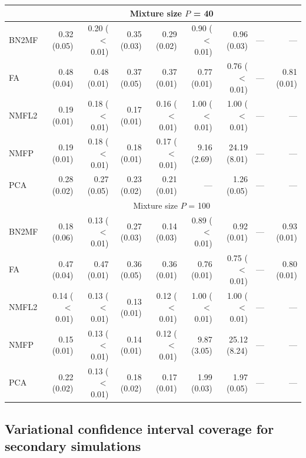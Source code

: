 {\begin{landscape}
\begin{table}[!htbp]
\begin{tabular}{lrr|rr|rr|rr}
\hline 
& \multicolumn{8}{c}{Mixture size $P$ = 40} \\
\hline 
BN2MF & 0.32 (0.05) & 0.20 ($<$0.01) & 0.35 (0.03) & 0.29 (0.02) & 0.90 ($<$0.01) & 0.96 (0.03) & --- & --- \\ 
FA & 0.48 (0.04) & 0.48 (0.01) & 0.37 (0.05) & 0.37 (0.01) & 0.77 (0.01) & 0.76 ($<$0.01) & --- & 0.81 (0.01) \\ 
NMFL2 & 0.19 (0.01) & 0.18 ($<$0.01) & 0.17 (0.01) & 0.16 ($<$0.01) & 1.00 ($<$0.01) & 1.00 ($<$0.01) & --- & --- \\ 
NMFP & 0.19 (0.01) & 0.18 ($<$0.01) & 0.18 (0.01) & 0.17 ($<$0.01) & 9.16 (2.69) & 24.19 (8.01) & --- & --- \\ 
PCA & 0.28 (0.02) & 0.27 (0.05) & 0.23 (0.02) & 0.21 (0.01) & --- & 1.26 (0.05) & --- & --- \\ 
\hline 
& \multicolumn{8}{c}{Mixture size $P$ = 100} \\
\hline 
BN2MF & 0.18 (0.06) & 0.13 ($<$0.01) & 0.27 (0.03) & 0.14 (0.03) & 0.89 ($<$0.01) & 0.92 (0.01) & --- & 0.93 (0.01) \\ 
FA & 0.47 (0.04) & 0.47 (0.01) & 0.36 (0.05) & 0.36 (0.01) & 0.76 (0.01) & 0.75 ($<$0.01) & --- & 0.80 (0.01) \\ 
NMFL2 & 0.14 ($<$0.01) & 0.13 ($<$0.01) & 0.13 (0.01) & 0.12 ($<$0.01) & 1.00 ($<$0.01) & 1.00 ($<$0.01) & --- & --- \\ 
NMFP & 0.15 (0.01) & 0.13 ($<$0.01) & 0.14 (0.01) & 0.12 ($<$0.01) & 9.87 (3.05) & 25.12 (8.24) & --- & --- \\ 
PCA & 0.22 (0.02) & 0.13 ($<$0.01) & 0.18 (0.02) & 0.17 (0.01) & 1.99 (0.03) & 1.97 (0.05) & --- & --- \\ 
\hline
\hline  
\end{tabular}
\end{table}
\endgroup
\end{landscape}

\clearpage
\subsection{Variational confidence interval coverage for secondary simulations}

}
